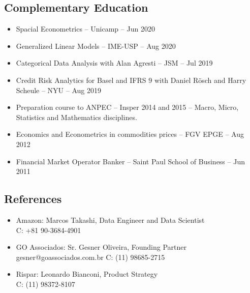 \documentclass{article}
\begin{document}
\begin{multicols}{2}
\subsection{Complementary Education}
\begin{itemize}
\item{Spacial Econometrics – Unicamp – Jun 2020}  
\item{Generalized Linear Models – IME-USP – Aug 2020} 
\item{Categorical Data Analysis with Alan Agresti – JSM – Jul 2019} 
\item{Credit Risk Analytics for Basel and IFRS 9 with Daniel Rösch and Harry Scheule – NYU – Aug 2019} 
\item{Preparation course to ANPEC – Insper 2014 and 2015 – Macro, Micro, Statistics and Mathematics disciplines.} 
\item{Economics and Econometrics in commodities prices – FGV EPGE – Aug 2012} 
\item{Financial Market Operator Banker – Saint Paul School of Business – Jun 2011}
\end{itemize}

\subsection{References}
\begin{itemize}
\item{Amazon: Marcos Takashi, Data Engineer and Data Scientist \\C: +81 90-3684-4901} 
\item{GO Associados: Sr. Gesner Oliveira, Founding Partner\\gesner@goassociados.com.br C: (11) 98685-2715} 
\item{Rispar: Leonardo Bianconi, Product Strategy \\C: (11) 98372-8107}
\end{itemize}

\end{multicols}
\end{document}
